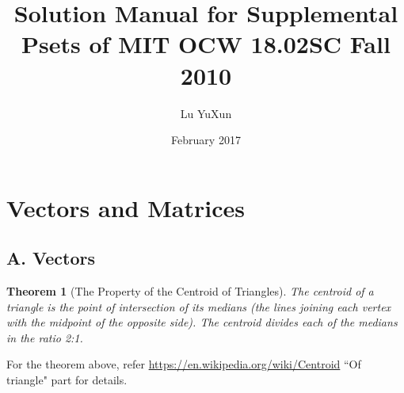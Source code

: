 \documentclass{article}
\title{Solution Manual for Supplemental Psets of MIT OCW 18.02SC Fall 2010}
\author{Lu YuXun}
\date{February 2017}
\newtheorem{theorem}{Theorem}
\begin{document}
\maketitle

\section{Vectors and Matrices}
\subsection{A. Vectors}
\begin{theorem}[The Property of the Centroid of Triangles]
The centroid of a triangle is the point of intersection of its medians (the lines joining each vertex with the midpoint of the opposite side). The centroid divides each of the medians in the ratio 2:1. 
\end{theorem}
For the theorem above, refer \url{https://en.wikipedia.org/wiki/Centroid} ``Of triangle" part for details.
\end{document}

